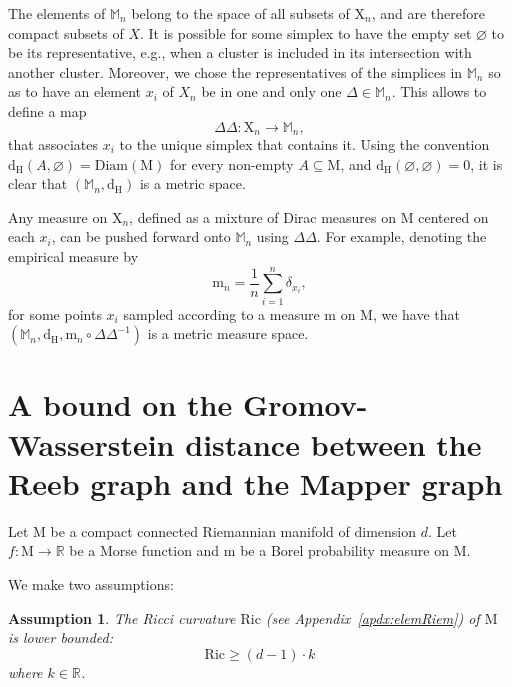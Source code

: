 \documentclass[pdflatex,sn-mathphys-ay]{sn-jnl}%
\newcommand{\spa}{X}
\newcommand{\man}{\mathrm{M}}
\newcommand{\sample}{\mathrm{X}}
\newcommand{\mes}{\mathrm{m}}
\newcommand{\haus}{{\mathrm {d_H}}}
\newcommand{\mapper}{{\mathbb{M}_n}}
\newcommand{\simp}{\Delta}
\newcommand{\DD}{\Delta\!\!\!\!\Delta}
\newcommand{\dirac}{\delta}
\newcommand{\diracn}{\mathrm{m}_n}
\newcommand{\diam}{\mathrm{Diam}}
\newcommand{\ricci}{\mathrm{Ric}}
\newcommand{\R}{\mathbb{R}}
\newcommand{\preim}[2]{#1^{-1}(#2)}
\newtheorem{hypothesis}{Assumption}
\newcommand{\change}[1]{\noindent #1}
\theoremstyle{thmstyleone}%
\begin{document}
The elements of $\mapper$ belong to the space of all subsets of $\sample_n$, and are therefore compact subsets of $\spa$. It is possible for some simplex to have the empty set $\varnothing$ to be its representative, e.g., when a cluster is included in its intersection with another cluster. 
Moreover, we chose the representatives of the simplices in $\mapper$ so as to have an element $x_i$ of $\spa_n$ be in one and only one $\simp\in\mapper$. This allows to define a map
 $$\DD\colon\sample_n\longrightarrow\mapper,$$
 that associates $x_i$ to the unique simplex that contains it. 
Using the convention
 $ \haus\left(A,\varnothing\right)=\diam\left(\man\right) $ 
 for every non-empty $A\subseteq\man$, and  $\haus\left(\varnothing,\varnothing\right)=0$,  it is clear that $\left(\mapper,\haus\right)$ is a metric space.

  
 \medskip 
 
 Any measure on $\sample_n$, defined as a mixture of Dirac measures on $\man$ centered on each $x_i$, can be pushed forward onto $\mapper$ using $\DD$. \change{For example, denoting the empirical measure by $$\diracn=\frac{1}{n}\sum_{i=1}^n \dirac_{x_i},$$
for some points $x_i$ sampled according to a measure $\mes$ on $\man$, we have that $(\mapper,\haus,\diracn\circ\DD^{-1})$ is a metric measure space.}

\section{A bound on the Gromov-Wasserstein distance between the Reeb graph and the Mapper graph}\label{sec:mapper}



Let $\man$ be a compact connected Riemannian manifold of dimension $d$. Let  $f\colon\man\rightarrow\R$ be a Morse function and $\mes$ be a Borel probability measure on $\man$.

We make two assumptions:

 \begin{hypothesis} \label{hypRicci}
    The Ricci curvature $\ricci$ (see Appendix~\ref{apdx:elemRiem}) of $\man$ is lower bounded: $$\ricci\geq(d-1)\cdot k  $$
    where $k \in \R$.
\end{hypothesis}
\end{document}
